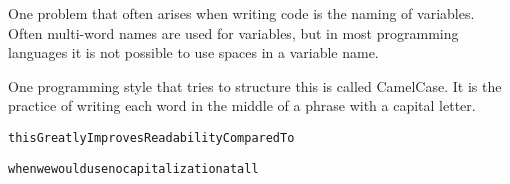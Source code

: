 
One problem that often arises when writing code is the naming of
variables. Often multi-word names are used for variables, but in most
programming languages it is not possible to use spaces in a variable
name.

One programming style that tries to structure this is called
CamelCase. It is the practice of writing each word in the middle of a
phrase with a capital letter.

\hfill{\tt thisGreatlyImprovesReadabilityComparedTo}

\hfill{\tt whenwewouldusenocapitalizationatall}

